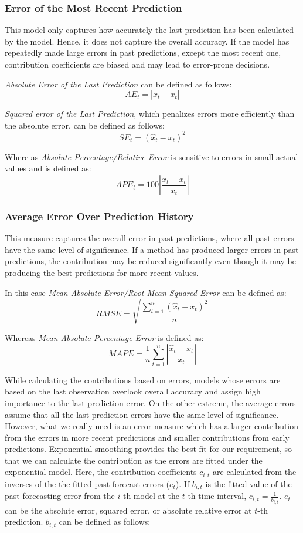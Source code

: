 \subsubsection{Error of the Most Recent Prediction}
This model only captures how accurately the last prediction has been calculated by the model. Hence, it does not capture the overall accuracy. If the model has repeatedly made large errors in past predictions, except the most recent one, contribution coefficients are biased and may lead to error-prone decisions.

\noindent
\textit{Absolute Error of the Last Prediction} can be defined as follows:
$$AE_t=|\hat{x}_t-x_t|$$

\noindent
\textit{Squared error of the Last Prediction}, which penalizes errors more efficiently than the absolute error, can be defined as follows:
$$SE_t=(\hat{x}_t-x_t)^2$$

\noindent
Where as \textit{Absolute Percentage/Relative Error} is sensitive to errors in small actual values and is defined as:
$$APE_t=100\left |\frac{\hat{x}_t-x_t}{x_t}  \right |$$

\subsubsection{Average Error Over Prediction History}
This measure captures the overall error in past predictions, where all past errors have the same level of significance. If a method has produced larger errors in past predictions, the contribution may be reduced significantly even though it may be producing the best predictions for more recent values.

\noindent
In this case \textit{Mean Absolute Error/Root Mean Squared Error} can be defined as:
$$RMSE=\sqrt{\frac{\sum_{t=1}^{n}(\hat{x}_{t}-x_{t})^{2}}{n}}$$ 

\noindent
Whereas \textit{Mean Absolute Percentage Error} is defined as:
$$MAPE=\frac{1}{n}\sum_{t=1}^{n}\left | \frac{\hat{x}_{t}-x_{t}}{x_{t}} \right |$$

While calculating the contributions based on errors, models whose errors are based on the last observation overlook overall accuracy and assign high importance to the last prediction error. On the other extreme, the average errors assume that all the last prediction errors have the same level of significance. However, what we really need is an error measure which has a larger contribution from the errors in more recent predictions and smaller contributions from early predictions. Exponential smoothing provides the best fit for our requirement, so that we can calculate the contribution as the errors are fitted under the exponential model. Here, the contribution coefficients $c_{i,t}$ are calculated from the inverses of the the fitted past forecast errors ($e_{t}$). If $b_{i,t}$ is the fitted value of the past forecasting error from the $i$-th model at the $t$-th time interval, $c_{i,t}=\frac{1}{b_{i,t}}$. $e_{t}$ can be the absolute error, squared error, or absolute relative error at $t$-th prediction. $b_{i,t}$ can be defined as follows:

